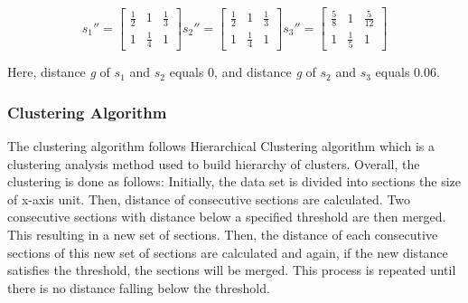 \documentclass{vgtc}                          %
\begin{document}
\[
s_1'' = \begin{bmatrix}
  \frac{1}{2} & 1 & \frac{1}{3}\\ 
  1 & \frac{1}{4} & 1
\end{bmatrix}
s_2'' = \begin{bmatrix}
  \frac{1}{2} & 1 & \frac{1}{3}\\ 
  1 & \frac{1}{4} & 1
\end{bmatrix}
s_3'' = \begin{bmatrix}
  \frac{5}{8} & 1 & \frac{5}{12}\\
  1 & \frac{1}{5} & 1 
\end{bmatrix}
\]

Here, distance \textit{g} of $s_1$ and $s_2$ equals 0, and distance \textit{g} of $s_2$ and $s_3$ equals 0.06. 

\subsubsection{Clustering Algorithm}
The clustering algorithm follows Hierarchical Clustering algorithm \cite{maimon} which is a clustering analysis method used to build hierarchy of clusters. Overall, the clustering is done as follows: Initially, the data set is divided into sections the size of x-axis unit. Then, distance of consecutive sections are calculated. Two consecutive sections with distance below a specified threshold are then merged. This resulting in a new set of sections. Then, the distance of each consecutive sections of this new set of sections are calculated and again, if the new distance satisfies the threshold, the sections will be merged. This process is repeated until there is no distance falling below the threshold.
\end{document}
